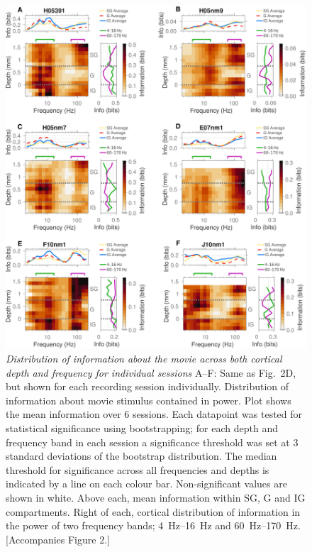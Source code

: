 \begin{figure}
\centering \includegraphics[width=\columnwidth]{paperfigs/figS2}
%
\caption{%
\textit{Distribution of information about the movie across both cortical depth and frequency for individual sessions}
A--F: Same as Fig.~2D, but shown for each recording session individually.
Distribution of information about movie stimulus contained in power.
Plot shows the mean information over 6 sessions.
Each datapoint was tested for statistical significance using bootstrapping; for each depth and frequency band in each session a significance threshold was set at 3 standard deviations of the bootstrap distribution.
The median threshold for significance across all frequencies and depths is indicated by a line on each colour bar.
Non-significant values are shown in white.
Above each, mean information within \ac{SG}, \ac{G} and \ac{IG} compartments.
Right of each, cortical distribution of information in the power of two frequency bands; \SIrange{4}{16}{Hz} and \SIrange{60}{170}{Hz}.
[Accompanies Figure 2.]
}
\label{fig:lam_s2}
%
\end{figure}


